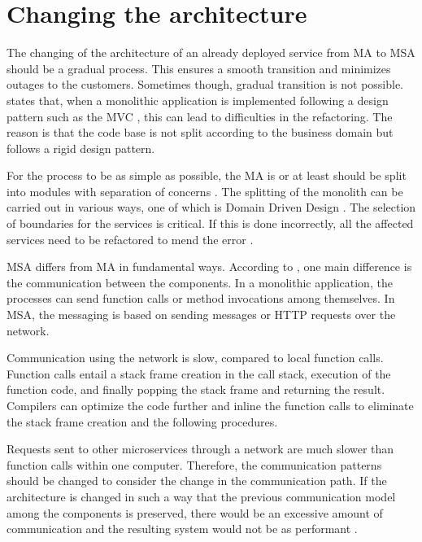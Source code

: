 \section{Changing the architecture}
\begin{sloppypar}
    The changing of the architecture of an already deployed service from MA to
    MSA should be a gradual process. This ensures a smooth transition and
    minimizes outages to the customers. Sometimes though, gradual transition is
    not possible. \citet{newman2019} states that, when a monolithic application
    is implemented following a design pattern such as the MVC \citep{trygvemvc},
    this can lead to difficulties in the refactoring. The reason is that the
    code base is not split according to the business domain but follows a rigid
    design pattern.
\end{sloppypar}
\begin{sloppypar}
    For the process to be as simple as possible, the MA is or at least should be
    split into modules with separation of concerns \citep{secchalmsa}. The
    splitting of the monolith can be carried out in various ways, one of which
    is Domain Driven Design \citep{evans2003}. The selection of boundaries for
    the services is critical. If this is done incorrectly, all the affected
    services need to be refactored to mend the error \citep{newman2019}.
\end{sloppypar}
\begin{sloppypar}
    MSA differs from MA in fundamental ways. According to \citet{fowlerlewisms},
    one main difference is the communication between the components. In a
    monolithic application, the processes can send function calls or method
    invocations among themselves. In MSA, the messaging is based on sending
    messages or HTTP requests over the network. 
\end{sloppypar}
\begin{sloppypar}
    Communication using the network is slow, compared to local function calls.
    Function calls entail a stack frame creation in the call stack, execution of
    the function code, and finally popping the stack frame and returning the
    result. Compilers can optimize the code further and inline the function
    calls to eliminate the stack frame creation and the following procedures.
\end{sloppypar}
\begin{sloppypar}
    Requests sent to other microservices through a network are much slower than
    function calls within one computer. Therefore, the communication patterns
    should be changed to consider the change in the communication path. If the
    architecture is changed in such a way that the previous communication model
    among the components is preserved, there would be an excessive amount of
    communication and the resulting system would not be as performant
    \citep{fowlerlewisms}. 
\end{sloppypar}
